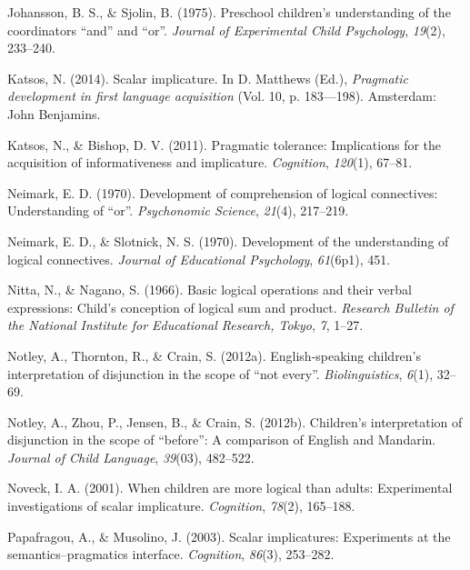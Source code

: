 \documentclass[
  english,
  ,man,floatsintext]{apa6}
\begin{document}
\leavevmode\hypertarget{ref-johansson1975preschool}{}%
Johansson, B. S., \& Sjolin, B. (1975). Preschool children's understanding of the coordinators ``and'' and ``or''. \emph{Journal of Experimental Child Psychology}, \emph{19}(2), 233--240.

\leavevmode\hypertarget{ref-katsos2014scalar}{}%
Katsos, N. (2014). Scalar implicature. In D. Matthews (Ed.), \emph{Pragmatic development in first language acquisition} (Vol. 10, p. 183---198). Amsterdam: John Benjamins.

\leavevmode\hypertarget{ref-katsos2011pragmatic}{}%
Katsos, N., \& Bishop, D. V. (2011). Pragmatic tolerance: Implications for the acquisition of informativeness and implicature. \emph{Cognition}, \emph{120}(1), 67--81.

\leavevmode\hypertarget{ref-neimark1970}{}%
Neimark, E. D. (1970). Development of comprehension of logical connectives: Understanding of ``or''. \emph{Psychonomic Science}, \emph{21}(4), 217--219.

\leavevmode\hypertarget{ref-neimarkSlotnick1970}{}%
Neimark, E. D., \& Slotnick, N. S. (1970). Development of the understanding of logical connectives. \emph{Journal of Educational Psychology}, \emph{61}(6p1), 451.

\leavevmode\hypertarget{ref-nitta1966basic}{}%
Nitta, N., \& Nagano, S. (1966). Basic logical operations and their verbal expressions: Child's conception of logical sum and product. \emph{Research Bulletin of the National Institute for Educational Research, Tokyo}, \emph{7}, 1--27.

\leavevmode\hypertarget{ref-notley2012notevery}{}%
Notley, A., Thornton, R., \& Crain, S. (2012a). English-speaking children's interpretation of disjunction in the scope of ``not every''. \emph{Biolinguistics}, \emph{6}(1), 32--69.

\leavevmode\hypertarget{ref-notley2012children}{}%
Notley, A., Zhou, P., Jensen, B., \& Crain, S. (2012b). Children's interpretation of disjunction in the scope of ``before'': A comparison of English and Mandarin. \emph{Journal of Child Language}, \emph{39}(03), 482--522.

\leavevmode\hypertarget{ref-noveck2001children}{}%
Noveck, I. A. (2001). When children are more logical than adults: Experimental investigations of scalar implicature. \emph{Cognition}, \emph{78}(2), 165--188.

\leavevmode\hypertarget{ref-papafragou2003scalar}{}%
Papafragou, A., \& Musolino, J. (2003). Scalar implicatures: Experiments at the semantics--pragmatics interface. \emph{Cognition}, \emph{86}(3), 253--282.
\end{document}
